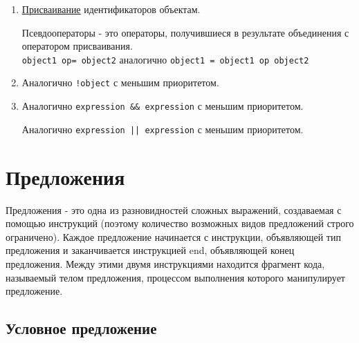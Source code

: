 \begin{enumerate}
  \item %
  \begin{operator}
    \hyperlink{appequal}{\underline{Присваивание}} идентификаторов объектам.
  \end{operator}

  \begin{operator}
    Псевдооператоры - это операторы, получившиеся в результате объединения с оператором присваивания.
    \\\verb!object1 op= object2! аналогично \verb!object1 = object1 op object2!
  \end{operator}

  \item %
  \begin{operator}
    Аналогично \verb|!object| с меньшим приоритетом.
  \end{operator}

  \item %
  \begin{operator}
    Аналогично \verb!expression && expression! с меньшим приоритетом.
  \end{operator}

  \begin{operator}
    Аналогично \verb!expression || expression! с меньшим приоритетом.
  \end{operator}
\end{enumerate}

\section{Предложения}

Предложения - это одна из разновидностей сложных выражений, создаваемая с помощью инструкций (поэтому количество возможных видов предложений строго ограничено). Каждое предложение начинается с инструкции, объявляющей тип предложения и заканчивается инструкцией end, объявляющей конец предложения. Между этими двумя инструкциями находится фрагмент кода, называемый телом предложения, процессом выполнения которого манипулирует предложение.

\subsection{Условное предложение}

